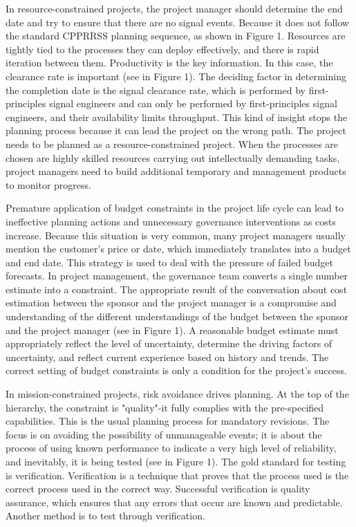 \documentclass{sigchi}
\begin{document}
In resource-constrained projects, the project manager should determine the end date and try to ensure that there are no signal events. Because it does not follow the standard CPPRRSS planning sequence, as shown in Figure 1. Resources are tightly tied to the processes they can deploy effectively, and there is rapid iteration between them. Productivity is the key information. In this case, the clearance rate is important (see in Figure 1). The deciding factor in determining the completion date is the signal clearance rate, which is performed by first-principles signal engineers and can only be performed by first-principles signal engineers, and their availability limits throughput. This kind of insight stops the planning process because it can lead the project on the wrong path. The project needs to be planned as a resource-constrained project. When the processes are chosen are highly skilled resources carrying out intellectually demanding tasks, project managers need to build additional temporary and management products to monitor progress.

Premature application of budget constraints in the project life cycle can lead to ineffective planning actions and unnecessary governance interventions as costs increase. Because this situation is very common, many project managers usually mention the customer's price or date, which immediately translates into a budget and end date. This strategy is used to deal with the pressure of failed budget forecasts. In project management, the governance team converts a single number estimate into a constraint. The appropriate result of the conversation about cost estimation between the sponsor and the project manager is a compromise and understanding of the different understandings of the budget between the sponsor and the project manager (see in Figure 1). A reasonable budget estimate must appropriately reflect the level of uncertainty, determine the driving factors of uncertainty, and reflect current experience based on history and trends. The correct setting of budget constraints is only a condition for the project's success.

In mission-constrained projects, risk avoidance drives planning. At the top of the hierarchy, the constraint is "quality"-it fully complies with the pre-specified capabilities. This is the usual planning process for mandatory revisions. The focus is on avoiding the possibility of unmanageable events; it is about the process of using known performance to indicate a very high level of reliability, and inevitably, it is being tested (see in Figure 1). The gold standard for testing is verification. Verification is a technique that proves that the process used is the correct process used in the correct way. Successful verification is quality assurance, which ensures that any errors that occur are known and predictable. Another method is to test through verification. 
\end{document}
